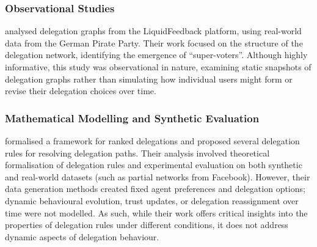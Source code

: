 \subsubsection{Observational Studies}

\citet{kling2015votingbehaviourpoweronline} analysed delegation graphs from the LiquidFeedback platform, using real-world data from the German Pirate Party. Their work focused on the structure of the delegation network, identifying the emergence of ``super-voters''. Although highly informative, this study was observational in nature, examining static snapshots of delegation graphs rather than simulating how individual users might form or revise their delegation choices over time.



\subsubsection{Mathematical Modelling and Synthetic Evaluation}

\citet{brill_liquid_2021} formalised a framework for ranked delegations and proposed several delegation rules for resolving delegation paths. Their analysis involved theoretical formalisation of delegation rules and experimental evaluation on both synthetic and real-world datasets (such as partial networks from Facebook). However, their data generation methods created fixed agent preferences and delegation options; dynamic behavioural evolution, trust updates, or delegation reassignment over time were not modelled. As such, while their work offers critical insights into the properties of delegation rules under different conditions, it does not address dynamic aspects of delegation behaviour.

